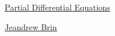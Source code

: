 \documentclass[11pt]{article}
\begin{document}
	\kaishu 
	\setcounter{section}{0}
	\begin{center}
		{\LARGE  \href{https://www.ideas4africa.co.za/pdes}{Partial Differential Equations}}
		
		
		{\large \href{https://www.ideas4africa.co.za/}{Jeandrew Brin}}
	\end{center}
\setcounter{page}{1}



\vspace{-1cm}
\end{document}
